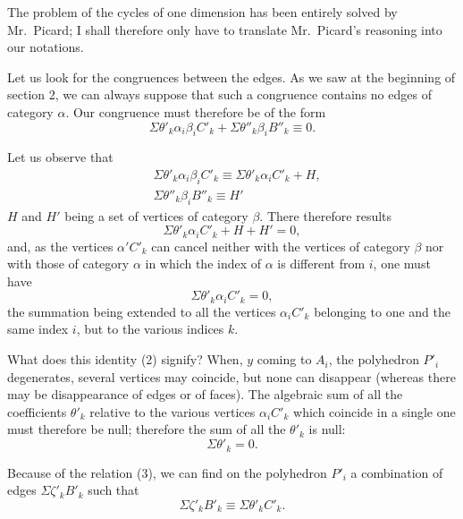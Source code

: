 \documentclass{article}
\begin{document}
The problem of the cycles of one dimension has been entirely solved by Mr.~Picard; I shall therefore only have to translate Mr.~Picard's reasoning into our notations.


Let us look for the congruences between the edges. As we saw at the beginning of section 2, we can always suppose that such a congruence contains no edges of category $\alpha$. Our congruence must therefore be of the form
\[ \Sigma \theta'_{k} \alpha_{i}\beta_{i}C'_{k} + \Sigma \theta''_{k} \beta_{i}B''_{k} \equiv 0. \tag{1} \]

Let us observe that
\[ \begin{aligned} &\Sigma \theta'_{k} \alpha_{i}\beta_{i}C'_{k} \equiv \Sigma \theta'_{k} \alpha_{i}C'_{k} + H,\\ &\Sigma \theta''_{k} \beta_{i}B''_{k} \equiv H' \end{aligned} \]
$H$ and $H'$ being a set of vertices of category $\beta$. There therefore results
\[ \Sigma \theta'_{k} \alpha_{i}C'_{k} + H + H' = 0, \]
and, as the vertices $\alpha'C'_{k}$ can cancel neither with the vertices of category $\beta$ nor with those of category $\alpha$ in which the index of $\alpha$ is different from $i$, one must have
\[ \Sigma \theta'_{k} \alpha_{i}C'_{k} = 0, \tag{2} \]
the summation being extended to all the vertices $\alpha_{i}C'_{k}$ belonging to one and the same index $i$, but to the various indices $k$.

What does this identity (2) signify? When, $y$ coming to $A_{i}$, the polyhedron $P'_{i}$ degenerates, several vertices may coincide, but none can disappear (whereas there may be disappearance of edges or of faces). The algebraic sum of all the coefficients $\theta'_{k}$ relative to the various vertices $\alpha_{i}C'_{k}$ which coincide in a single one must therefore be null; therefore the sum of all the $\theta'_{k}$ is null:
\[ \Sigma \theta'_{k} = 0. \tag{3} \]

Because of the relation (3), we can find on the polyhedron $P'_{i}$ a combination of edges $\Sigma \zeta'_{k} B'_{k}$ such that
\[ \Sigma \zeta'_{k} B'_{k} \equiv \Sigma \theta'_{k} C'_{k}. \tag{4} \]
\end{document}
